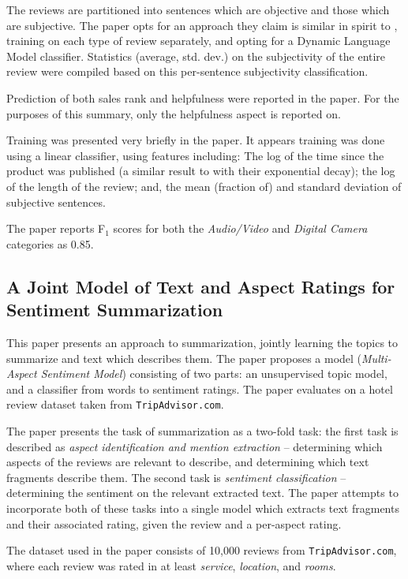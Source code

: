 \documentclass[12pt,letterpaper]{article}
\begin{document}
The reviews are partitioned into sentences which are objective and those which are subjective.
The paper opts for an approach they claim is similar in spirit to \cite{2004pang-mincuts}, training on
	each type of review separately, and opting for a Dynamic Language Model classifier.
Statistics (average, std. dev.) on 
	the subjectivity of the entire review were compiled based on this per-sentence subjectivity
	classification.

Prediction of both sales rank and helpfulness were reported in the paper. 
For the purposes of this summary, only the helpfulness aspect is reported on.

Training was presented very briefly in the paper.
It appears training was done using a linear classifier, using features including: 
The log of the time since the product was published (a similar result to \cite{2008liu-helpfulness}
	with their exponential decay);
the log of the length of the review;
and, the mean (fraction of) and standard deviation of subjective sentences.

The paper reports F$_1$ scores for both the {\em Audio/Video} and {\em Digital Camera} categories as 0.85.


\subsection{A Joint Model of Text and Aspect Ratings for Sentiment Summarization \cite{2008titov-summarization}}

This paper presents an approach to summarization, jointly learning the topics to summarize and text which
	describes them.
The paper proposes a model ({\em Multi-Aspect Sentiment Model}) consisting of two parts: 
	an unsupervised topic model, and a classifier from words to sentiment ratings.
The paper evaluates on a hotel review dataset taken from {\tt TripAdvisor.com}.

The paper presents the task of summarization as a two-fold task: the first task
	is described as {\em aspect identification and mention extraction} -- determining which aspects of the
	reviews are relevant to describe, and determining which text fragments describe them.
The second task is {\em sentiment classification} -- determining the sentiment on the
	relevant extracted text.
The paper attempts to incorporate both of these tasks into a single model which extracts text fragments
	and their associated rating, given the review and a per-aspect rating.

The dataset used in the paper consists of 10,000 reviews from {\tt TripAdvisor.com}, where each
review was rated in at least {\em service}, {\em location}, and {\em rooms}.
\end{document}

